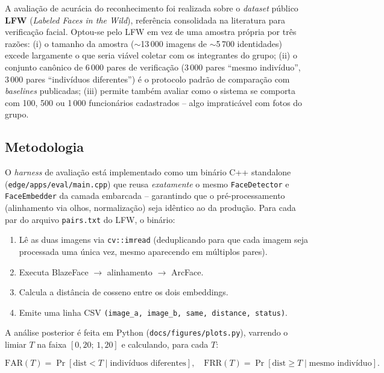 \documentclass[12pt,a4paper]{report}
\begin{document}
A avaliação de acurácia do reconhecimento foi realizada sobre o
\textit{dataset} público \textbf{LFW} (\textit{Labeled Faces in the
Wild}), referência consolidada na literatura para verificação facial.
Optou-se pelo LFW em vez de uma amostra própria por três razões:
(i) o tamanho da amostra ($\sim$13\,000 imagens de $\sim$5\,700
identidades) excede largamente o que seria viável coletar com os
integrantes do grupo; (ii) o conjunto canônico de 6\,000 pares de
verificação (3\,000 pares ``mesmo indivíduo'', 3\,000 pares
``indivíduos diferentes'') é o protocolo padrão de comparação com
\textit{baselines} publicadas; (iii) permite também avaliar como o
sistema se comporta com 100, 500 ou 1\,000 funcionários cadastrados
-- algo impraticável com fotos do grupo.

\subsection{Metodologia}

O \textit{harness} de avaliação está implementado como um binário
C++ standalone (\texttt{edge/apps/eval/main.cpp}) que reusa
\emph{exatamente} o mesmo \texttt{FaceDetector} e \texttt{FaceEmbedder}
da camada embarcada -- garantindo que o pré-processamento (alinhamento
via olhos, normalização) seja idêntico ao da produção. Para cada par
do arquivo \texttt{pairs.txt} do LFW, o binário:

\begin{enumerate}
    \item Lê as duas imagens via \texttt{cv::imread} (deduplicando para
        que cada imagem seja processada uma única vez, mesmo aparecendo
        em múltiplos pares).
    \item Executa BlazeFace $\rightarrow$ alinhamento $\rightarrow$
        ArcFace.
    \item Calcula a distância de cosseno entre os dois embeddings.
    \item Emite uma linha CSV \texttt{(image\_a, image\_b, same,
        distance, status)}.
\end{enumerate}

A análise posterior é feita em Python (\texttt{docs/figures/plots.py}),
varrendo o limiar $T$ na faixa $[0{,}20;\,1{,}20]$ e calculando, para
cada $T$:

\[
    \mathrm{FAR}(T) = \Pr[\mathrm{dist} < T \mid \text{indivíduos
    diferentes}], \quad
    \mathrm{FRR}(T) = \Pr[\mathrm{dist} \geq T \mid \text{mesmo
    indivíduo}].
\]
\end{document}
